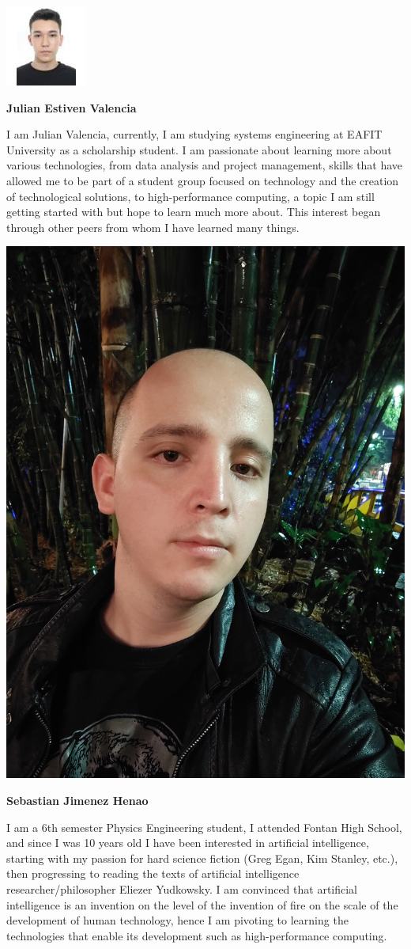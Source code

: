 \documentclass[11pt,a4paper,twocolumn]{article}
\begin{document}
    \begin{center}
        \includegraphics[width = .45\linewidth]{Images/Julian Valencia.jpeg}
    \end{center}
    \begin{center}
        \textbf{Julian Estiven Valencia}
    \end{center}
    I am Julian Valencia, currently, I am studying systems engineering at EAFIT University as a scholarship student. I am passionate about learning more about various technologies, from data analysis and project management, skills that have allowed me to be part of a student group focused on technology and the creation of technological solutions, to high-performance computing, a topic I am still getting started with but hope to learn much more about. This interest began through other peers from whom I have learned many things.

    \begin{center}
        \includegraphics[width = .45\linewidth]{Images/Sebastian Henao.jpg}
    \end{center}
    \begin{center}
        \textbf{Sebastian Jimenez Henao}
    \end{center}
    I am a 6th semester Physics Engineering student, I attended Fontan High School, and since I was 10 years old I have been interested in artificial intelligence, starting with my passion for hard science fiction (Greg Egan, Kim Stanley, etc.), then progressing to reading the texts of artificial intelligence researcher/philosopher Eliezer Yudkowsky. I am convinced that artificial intelligence is an invention on the level of the invention of fire on the scale of the development of human technology, hence I am pivoting to learning the technologies that enable its development such as high-performance computing.
\end{document}
